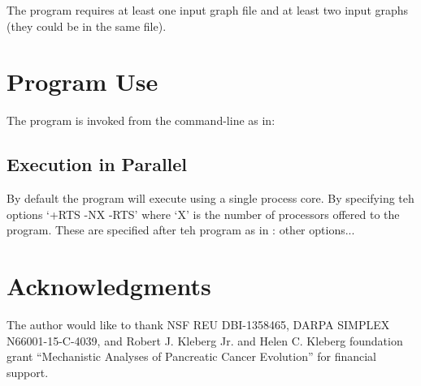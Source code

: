 \documentclass[11pt]{memoir}
\begin{document}
	The program requires at least one input graph file and at least two input graphs (they could be in the same file).

	
	\section{Program Use}
	The program is invoked from the command-line as in:
	
	
	\subsection{Execution in Parallel}
	By default the program will execute using a single process core.  By specifying teh options `+RTS -NX -RTS' where `X' is the number of processors offered to the program. These are specified after teh program as in :
	other options...  
	
	
	\section*{Acknowledgments}
	The author would like to thank NSF REU DBI-1358465, DARPA SIMPLEX N66001-15-C-4039, and Robert J. Kleberg Jr. and Helen C. Kleberg foundation grant ``Mechanistic Analyses of Pancreatic Cancer Evolution'' for financial support.  
	
	\newpage
	
\end{document}
